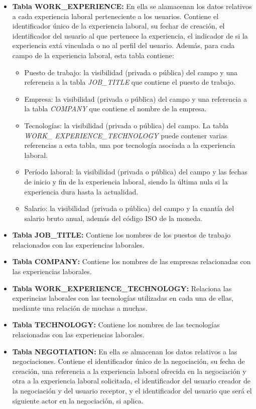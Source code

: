 \documentclass[a4paper, 12pt]{book}
\begin{document}
	\begin{itemize}
	\item \textbf{Tabla WORK\_EXPERIENCE:} En ella se alamacenan los datos relativos a cada experiencia laboral perteneciente a los usuarios.
	Contiene el identificador único de la experiencia laboral, su fechar de creación, el identificador del usuario al que pertenece la experiencia, el indicador de si la experiencia extá vinculada o no al perfil del usuario.
	Además, para cada campo de la experiencia laboral, esta tabla contiene:
		\begin{itemize}
		\item Puesto de trabajo: la visibilidad (privada o pública) del campo y una referencia a la tabla \emph{JOB\_TITLE} que contiene el puesto de trabajo.
		\item Empresa: la visibilidad (privada o pública) del campo y una referencia a la tabla \emph{COMPANY} que contiene el nombre de la empresa.
		\item Tecnologías: la visibilidad (privada o pública) del campo. La tabla \emph{WORK\_ EXPERIENCE\_TECHNOLOGY} puede contener varias referencias a esta tabla, una por tecnología asociada a la experiencia laboral.
		\item Período laboral: la visibilidad (privada o pública) del campo y las fechas de inicio y fin de la experiencia laboral, siendo la última nula si la experiencia dura hasta la actualidad.
		\item Salario: la visibilidad (privada o pública) del campo y la cuantía del salario bruto anual, además del código ISO de la moneda.
		\end{itemize}
	\item \textbf{Tabla JOB\_TITLE:} Contiene los nombres de los puestos de trabajo relacionados con las experiencias laborales.
	\item \textbf{Tabla COMPANY:} Contiene los nombres de las empresas relacionadas con las experiencias laborales.
	\item \textbf{Tabla WORK\_EXPERIENCE\_TECHNOLOGY:} Relaciona las experincias laborales con las tecnologías utilizadas en cada una de ellas, mediante una relación de muchas a muchas.
	\item \textbf{Tabla TECHNOLOGY:} Contiene los nombres de las tecnologías relacionadas con las experiencias laborales.
	\item \textbf{Tabla NEGOTIATION:} En ella se almacenan los datos relativos a las negociaciones.
	Contiene el identificador único de la negociación, su fecha de creación, una referencia a la experiencia laboral ofrecida en la negociación y otra a la experiencia laboral solicitada, el identificador del usuario creador de la negociación y del usuario receptor, y el identificador del usuario que será el siguiente actor en la negociación, si aplica.

\end{itemize}
\end{document}
